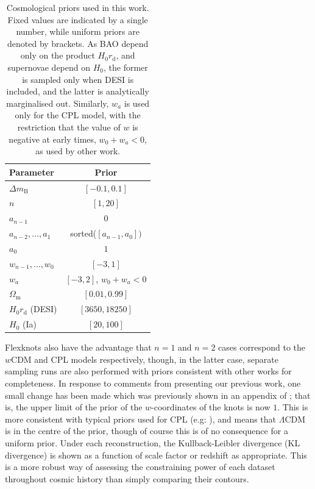 \documentclass[fleqn,usenatbib]{mnras}
\newcommand{\lcdm}{$\Lambda$CDM}
\newcommand{\dmb}{\ensuremath{\Delta m_\mathrm B}}
\begin{document}
    \begin{table}
        \centering
        \begin{tabular}{|l|c|}
            \hline
            Parameter & Prior \\
            \hline
            \dmb{} & $[-0.1, 0.1]$ \\
            $n$ & $[1, 20]$ \\
            $a_{n-1}$ & $0$ \\
            $a_{n-2}, \dots, a_1$ & sorted($[a_{n-1}, a_0])$ \\
            $a_0$ & $1$ \\
            $w_{n-1}, \dots, w_0$ & $[-3, 1]$ \\
            $w_a$ & $[-3, 2]$, $w_0+w_a<0$ \\
            $\Omega_\mathrm m$ & $[0.01, 0.99]$ \\
            $H_0r_\mathrm d$ (DESI)& $[3650, 18250]$ \\
            $H_0$ (Ia) & $[20, 100]$ \\
            \hline
        \end{tabular}
        \caption{
            Cosmological priors used in this work.
            Fixed values are indicated by a single number, while uniform priors are denoted by brackets.
            As BAO depend only on the product $H_0r_\mathrm d$, and supernovae depend on $H_0$, the former is sampled only when DESI is included, and the latter is analytically marginalised out.
            Similarly, $w_a$ is used only for the CPL model, with the restriction that the value of $w$ is negative at early times, $w_0 + w_a<0$, as used by other work.
        }
        \label{tab:priors}
    \end{table}

    Flexknots also have the advantage that $n=1$ and $n=2$ cases correspond to the $w$CDM and CPL models respectively, though, in the latter case, separate sampling runs are also performed with priors consistent with other works for completeness.
    In response to comments from presenting our previous work, one small change has been made which was previously shown in an appendix of \citet{paper2}; that is, the upper limit of the prior of the $w$-coordinates of the knots is now $1$. This is more consistent with typical priors used for CPL (e.g: \citet{planck15parameters, planck18vi, desivi, desi2i, desi2ii, desi2de}), and means that \lcdm{} is in the centre of the prior, though of course this is of no consequence for a uniform prior.
    Under each reconstruction, the Kullback-Leibler divergence (KL divergence) is shown as a function of scale factor or redshift as appropriate.
    This is a more robust way of assessing the constraining power of each dataset throughout cosmic history than simply comparing their contours.
\end{document}
